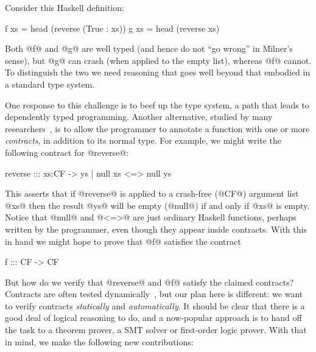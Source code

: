 Consider this Haskell definition:
\begin{code}
  f xs = head (reverse (True : xs))
  g xs = head (reverse xs)
\end{code}
Both @f@ and @g@ are well typed (and hence do not ``go wrong'' in Milner's sense),
but @g@ can crash (when applied to the empty list), whereas @f@ cannot.
To distinguish the two we need reasoning that goes well beyond 
that embodied in a standard type system.

One response to this challenge is to beef up the type system, a 
path that leads to dependently typed programming.  Another alternative,
studied by many researchers~\cite{contracts-literature}, is to allow 
the programmer to annotate a function with one or more
\emph{contracts}, in addition to its normal type.
For example, we might write the following contract for @reverse@:
\begin{code}
  reverse ::: xs:CF -> { ys | null xs <=> null ys }
\end{code}
This asserts that if @reverse@ is applied to a crash-free (@CF@) argument list @xs@
then the result @ys@ will be empty (@null@) if and only if @xs@ is empty.
Notice that @null@ and @<=>@ are just ordinary Haskell functions, perhaps
written by the programmer, even though they appear inside contracts.
With this in hand we might hope to prove that @f@ satisfies the contract
\begin{code}
  f ::: CF -> CF
\end{code}
But how do we verify that @reverse@ and @f@ satisfy the claimed
contracts? Contracts are often tested dynamically~\cite{finder-felliesen}, but 
our plan here is different: we want to verify contracts \emph{statically} 
and \emph{automatically}. It should be clear that there is a good deal of logical reasoning to do,
and a now-popular approach is to hand off the task to a theorem
prover, a SMT solver or first-order logic prover.
With that in mind, we make the following new contributions:
